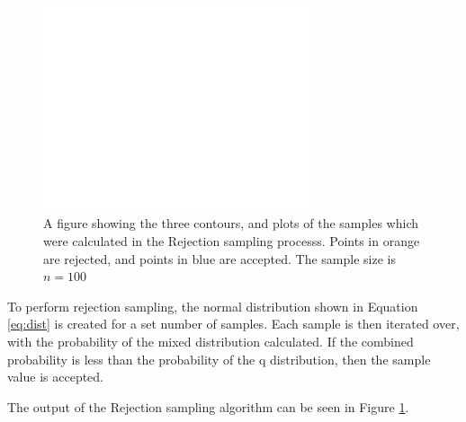 \documentclass[a4paper, 11pt]{article}
\begin{document}
\begin{figure}[h]
    \includegraphics[width=8cm]{fig/3dcontour.jpg}
    \caption{A figure showing the three contours, and plots of the samples which were calculated in the Rejection sampling processs. Points in orange are rejected, and points in blue are accepted. The sample size is $n=100$}
    \label{fig:rejectionsampling}
\end{figure}
To perform rejection sampling, the normal distribution shown in Equation \ref{eq:dist} is created for a set number of samples. Each sample is then iterated over, with the probability of the mixed distribution calculated. If the combined probability is less than the probability of the q distribution, then the sample value is accepted.

The output of the Rejection sampling algorithm can be seen in Figure \ref*{fig:rejectionsampling}.
\end{document}
